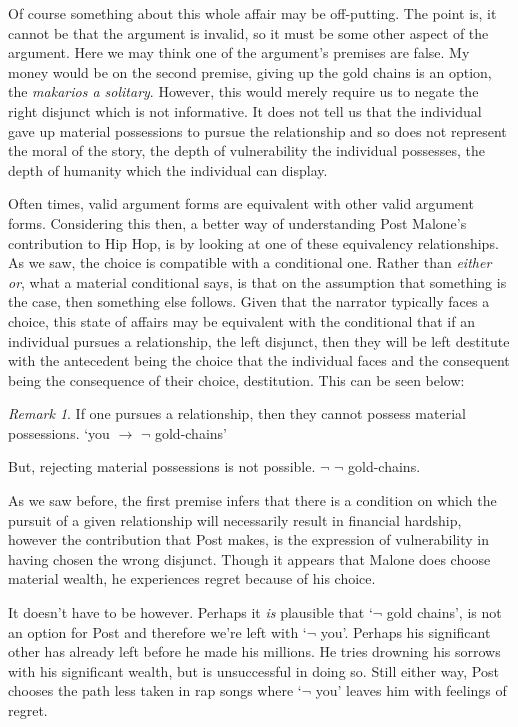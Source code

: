 \documentclass[
  12pt,
]{book}
\theoremstyle{definition}
\theoremstyle{definition}
\theoremstyle{definition}
\theoremstyle{definition}
\theoremstyle{remark}
\newtheorem*{remark}{Remark}
\begin{document}
Of course something about this whole affair may be off-putting. The point is, it cannot be that the argument is invalid, so it must be some other aspect of the argument. Here we may think one of the argument's premises are false. My money would be on the second premise, giving up the gold chains is an option, the \emph{makarios a solitary}. However, this would merely require us to negate the right disjunct which is not informative. It does not tell us that the individual gave up material possessions to pursue the relationship and so does not represent the moral of the story, the depth of vulnerability the individual possesses, the depth of humanity which the individual can display.

Often times, valid argument forms are equivalent with other valid argument forms. Considering this then, a better way of understanding Post Malone's contribution to Hip Hop, is by looking at one of these equivalency relationships. As we saw, the choice is compatible with a conditional one. Rather than \emph{either or}, what a material conditional says, is that on the assumption that something is the case, then something else follows. Given that the narrator typically faces a choice, this state of affairs may be equivalent with the conditional that if an individual pursues a relationship, the left disjunct, then they will be left destitute with the antecedent being the choice that the individual faces and the consequent being the consequence of their choice, destitution. This can be seen below:

\begin{remark}
If one pursues a relationship, then they cannot possess material possessions. `you \(\rightarrow\) \(\lnot\) gold-chains'
\end{remark}

But, rejecting material possessions is not possible. \(\lnot\) \(\lnot\) gold-chains.

As we saw before, the first premise infers that there is a condition on which the pursuit of a given relationship will necessarily result in financial hardship, however the contribution that Post makes, is the expression of vulnerability in having chosen the wrong disjunct. Though it appears that Malone does choose material wealth, he experiences regret because of his choice.

It doesn't have to be however. Perhaps it \emph{is} plausible that `\(\lnot\) gold chains', is not an option for Post and therefore we're left with `\(\lnot\) you'. Perhaps his significant other has already left before he made his millions. He tries drowning his sorrows with his significant wealth, but is unsuccessful in doing so. Still either way, Post chooses the path less taken in rap songs where `\(\lnot\) you' leaves him with feelings of regret.
\end{document}
